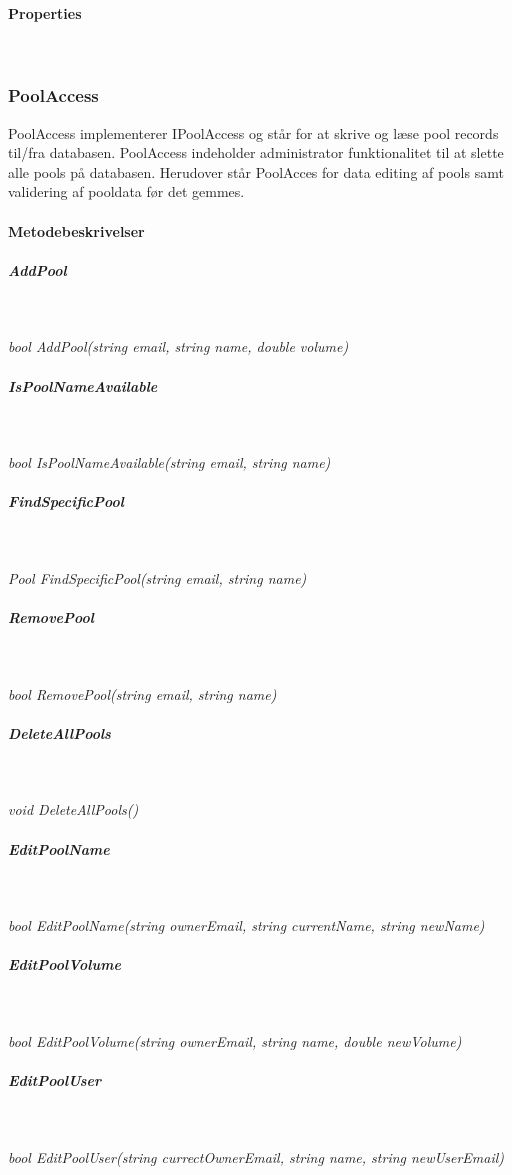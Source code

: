\paragraph{Properties}\


\subsubsection{PoolAccess}
PoolAccess implementerer IPoolAccess og står for at skrive og læse pool records til/fra databasen. PoolAccess indeholder administrator funktionalitet til at slette alle pools på databasen. Herudover står PoolAcces for data editing af pools samt validering af pooldata før det gemmes.


\paragraph{Metodebeskrivelser}

\subparagraph{AddPool}\

\textit{bool AddPool(string email, string name, double volume)}

\subparagraph{IsPoolNameAvailable}\

\textit{bool IsPoolNameAvailable(string email, string name)}

\subparagraph{FindSpecificPool}\

\textit{Pool FindSpecificPool(string email, string name)}

\subparagraph{RemovePool}\

\textit{bool RemovePool(string email, string name)}

\subparagraph{DeleteAllPools}\

\textit{void DeleteAllPools()}

\subparagraph{EditPoolName}\

\textit{bool EditPoolName(string ownerEmail, string currentName, string newName)}

\subparagraph{EditPoolVolume}\

\textit{bool EditPoolVolume(string ownerEmail, string name, double newVolume)}

\subparagraph{EditPoolUser}\

\textit{bool EditPoolUser(string currectOwnerEmail, string name, string newUserEmail)}


